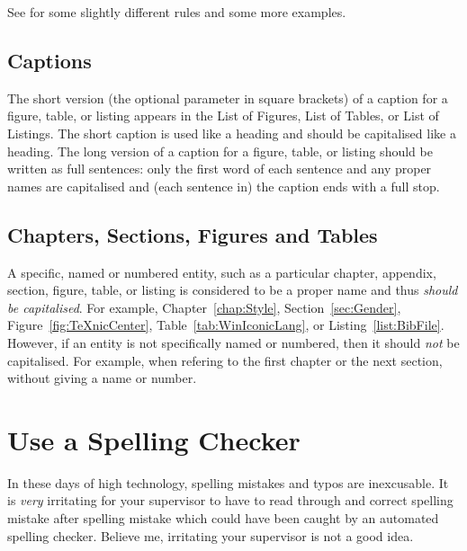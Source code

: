 See \citet{WB-Capitalisation} for some slightly different rules and
some more examples.






\subsection{Captions}

The short version (the optional parameter in square brackets) of a
caption for a figure, table, or listing appears in the List of
Figures, List of Tables, or List of Listings. The short caption is
used like a heading and should be capitalised like a heading. The long
version of a caption for a figure, table, or listing should be written
as full sentences: only the first word of each sentence and any proper
names are capitalised and (each sentence in) the caption ends with a
full stop.




\subsection{Chapters, Sections, Figures and Tables}

A specific, named or numbered entity, such as a particular chapter,
appendix, section, figure, table, or listing is considered to be a
proper name and thus \emph{should be capitalised}. For example,
Chapter~\ref{chap:Style}, Section~\ref{sec:Gender},
Figure~\ref{fig:TeXnicCenter}, Table~\ref{tab:WinIconicLang}, or
Listing~\ref{list:BibFile}. However, if an entity is not specifically
named or numbered, then it should \emph{not} be capitalised. For
example, when refering to the first chapter or the next section,
without giving a name or number.








\section{Use a Spelling Checker}

In these days of high technology, spelling mistakes and typos are
inexcusable. It is \emph{very} irritating for your supervisor to have
to read through and correct spelling mistake after spelling mistake
which could have been caught by an automated spelling checker.
Believe me, irritating your supervisor is not a good idea.

